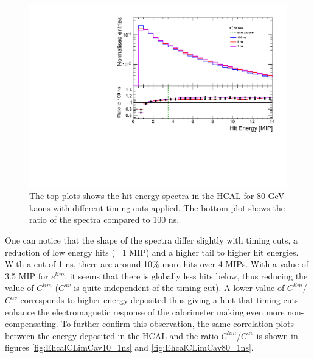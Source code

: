 \begin{figure}[htbp!]
  \centering
  \includegraphics[width=0.7\linewidth]{../Thesis_Plots/ILD/AdditionalPlots/Plots/HitEnergySpectra_80GeV.pdf}
  \caption{The top plots shows the hit energy spectra in the HCAL for 80 GeV kaons with different timing cuts applied. The bottom plot shows the ratio of the spectra compared to 100 ns.} \label{fig:HitSpectra80_timingcuts}
\end{figure}

One can notice that the shape of the spectra differ slightly with timing cuts, a reduction of low energy hits (~ 1 MIP) and a higher tail to higher hit energies. With a cut of 1 ns, there are around 10\% more hits over 4 MIPs. With a value of 3.5 MIP for $e^{lim}$, it seems that there is globally less hits below, thus reducing the value of $C^{lim}$ ($C^{av}$ is quite independent of the timing cut). A lower value of $C^{lim}$/$C^{av}$ corresponds to higher energy deposited thus giving a hint that timing cuts enhance the electromagnetic response of the calorimeter making even more non-compensating. To further confirm this observation, the same correlation plots between the energy deposited in the HCAL and the ratio $C^{lim}$/$C^{av}$ is shown in figures \ref{fig:EhcalCLimCav10_1ns} and \ref{fig:EhcalCLimCav80_1ns}.

